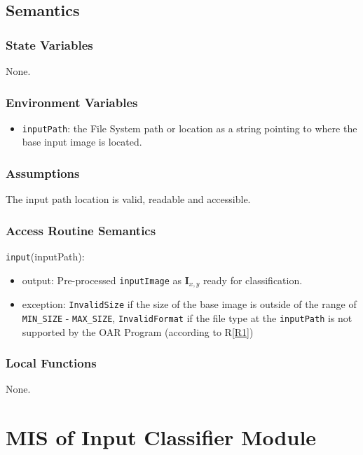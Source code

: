\documentclass[12pt, titlepage]{article}
\def\code#1{\texttt{#1}}
\begin{document}
\subsection{Semantics}

\subsubsection{State Variables}

None.

\subsubsection{Environment Variables}

\begin{itemize}
  \item \code{inputPath}: the File System path or location as a string pointing to where the base input image is located.
\end{itemize}

\subsubsection{Assumptions}

The input path location is valid, readable and accessible.

\subsubsection{Access Routine Semantics}

\noindent \code{input}(inputPath):
\begin{itemize}
\item output: Pre-processed \code{inputImage} as $\mathbf{I}_{x,y}$ ready for classification.
\item exception: \code{InvalidSize} if the size of the base image is outside of the range of 
\code{MIN\_SIZE} - \code{MAX\_SIZE}, \code{InvalidFormat} if the file type at the \code{inputPath} is not 
supported by the OAR Program (according to R\ref{R1})
\end{itemize}

\subsubsection{Local Functions}

None.


\section{MIS of Input Classifier Module} \label{ModuleIC} 
\end{document}
